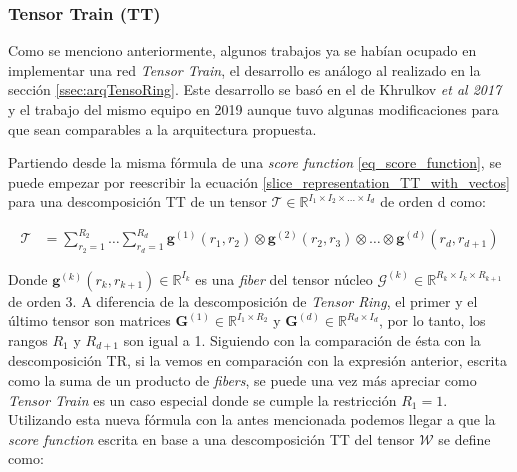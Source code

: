 \documentclass[spanish]{article}
\theoremstyle{definition}
\theoremstyle{remark}
\numberwithin{equation}{section}
\numberwithin{equation}{section} %
\begin{document}
\subsubsection{Tensor Train (TT)}
\label{ssec:tt_implementation}
Como se menciono anteriormente, algunos trabajos ya se habían ocupado en implementar una red \textit{Tensor Train}, el desarrollo es análogo al realizado en la sección \ref{ssec:arqTensoRing}. Este desarrollo se basó en el de Khrulkov \textit{ et al 2017} \cite{khrulkov2017expressive} y el trabajo del mismo equipo en 2019 \cite{khrulkov2019generalized} aunque tuvo algunas modificaciones para que sean comparables a la arquitectura propuesta. \par
Partiendo desde la misma fórmula de una \textit{score function} \eqref{eq_score_function}, se puede empezar por reescribir la ecuación \eqref{slice_representation_TT_with_vectos} para una descomposición TT de un tensor $\mathcal{T} \in \mathbb{R}^{I_1 \times I_2 \times ... \times I_d}$ de orden d como: \par
\begin{equation}
\label{eq_tensor_train_tensor_sum_of_outer_products}
\begin{split}
\mathcal{T}&
=\sum^{R_2}_{r_2=1}\ldots\sum^{R_{d}}_{r_{d}=1} \boldsymbol{g}^{(1)}(r_1,r_2) \otimes \boldsymbol{g}^{(2)}(r_2,r_3) \otimes \dots  \otimes \boldsymbol{g}^{(d)}(r_d,r_{d+1})
\end{split}
\end{equation}
\par
Donde $\boldsymbol{g}^{(k)}(r_k,r_{k+1}) \in \mathbb{R}^{I_k}$ es una \textit{fiber} del tensor núcleo $\mathcal{G}^{(k)} \in \mathbb{R}^{R_k \times I_k \times R_{k+1}}$ de orden 3. A diferencia de la descomposición de \textit{Tensor Ring}, el primer y el último tensor son matrices $\boldsymbol{G}^{(1)} \in \mathbb{R}^{I_1 \times R_{2}}$ y $\boldsymbol{G}^{(d)} \in \mathbb{R}^{R_d \times I_d}$, por lo tanto, los rangos $R_1$ y $R_{d+1}$ son igual a 1. Siguiendo con la comparación de ésta con la descomposición TR, si la vemos en comparación con la expresión anterior, escrita como la suma de un producto de \textit{fibers}, se puede una vez más apreciar como \textit{Tensor Train} es un caso especial donde se cumple la restricción $R_{1}=1$. Utilizando esta nueva fórmula con la antes mencionada podemos llegar a que la \textit{score function} escrita en base a una descomposición TT del tensor $\mathcal{W}$ se define como: \par
\end{document}
